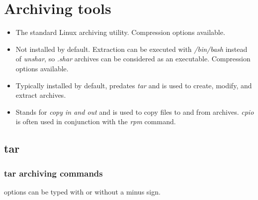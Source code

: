 \section{Archiving tools}
\begin{itemize}
	\item {}The standard Linux archiving utility. Compression options available.
	\item {}Not installed by default. Extraction can be executed with \textsl{/bin/bash} instead of \emph{unshar}, so \textsl{.shar} archives can be considered as an executable. Compression options available.
	\item {} Typically installed by default, predates \emph{tar} and is used to create, modify, and extract archives.
	\item {} Stands for \emph{copy in and out} and is used to copy files to and from archives. \emph{cpio} is often used in conjunction with the \emph{rpm} command.
\end{itemize}

\subsection{tar}

\subsubsection{tar archiving commands}

 options can be typed with or without a minus sign.

